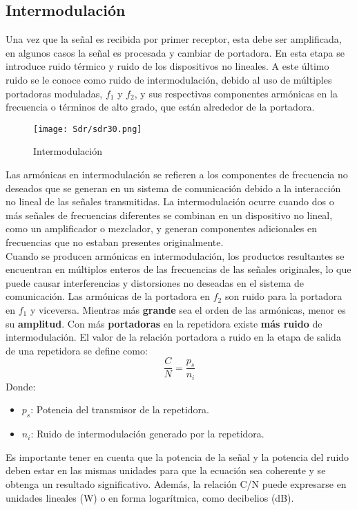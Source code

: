 \documentclass[
	12pt, %
	fleqn, %
	a4paper, %
	oneside, %
]{LegrandOrangeBook}
\begin{document}
\subsection{Intermodulación}
Una vez que la señal es recibida por primer receptor, esta debe ser amplificada, en algunos casos la señal es procesada y cambiar de portadora. En esta etapa se introduce ruido térmico y ruido de los dispositivos no lineales. A este último ruido se le conoce como ruido de intermodulación, debido al uso de múltiples portadoras moduladas, $f_1$ y $f_2$, y sus respectivas componentes armónicas en la frecuencia o términos de alto grado, que están alrededor de la portadora.
\begin{figure}[H]
\centering
\texttt{[image: Sdr/sdr30.png]}
\caption{Intermodulación}
\end{figure}
Las armónicas en intermodulación se refieren a los componentes de frecuencia no deseados que se generan en un sistema de comunicación debido a la interacción no lineal de las señales transmitidas. La intermodulación ocurre cuando dos o más señales de frecuencias diferentes se combinan en un dispositivo no lineal, como un amplificador o mezclador, y generan componentes adicionales en frecuencias que no estaban presentes originalmente.\\
Cuando se producen armónicas en intermodulación, los productos resultantes se encuentran en múltiplos enteros de las frecuencias de las señales originales, lo que puede causar interferencias y distorsiones no deseadas en el sistema de comunicación. Las armónicas de la portadora en $f_2$ son ruido para la portadora en $f_1$ y viceversa. Mientras más \textbf{grande} sea el orden de las armónicas, menor es su \textbf{amplitud}. Con más \textbf{portadoras} en la repetidora existe \textbf{más ruido} de intermodulación.
El valor de la relación portadora a ruido en la etapa de salida de una repetidora se define como:
\begin{equation}
\frac{C}{N}=\frac{p_s}{n_i}
\end{equation}
Donde:
\begin{itemize}
\item $p_s$: Potencia del transmisor de la repetidora.
\item $n_i$: Ruido de intermodulación generado por la repetidora.
\end{itemize}
\begin{remark}
Es importante tener en cuenta que la potencia de la señal y la potencia del ruido deben estar en las mismas unidades para que la ecuación sea coherente y se obtenga un resultado significativo. Además, la relación C/N puede expresarse en unidades lineales (W) o en forma logarítmica, como decibelios (dB).
\end{remark}
\end{document}
